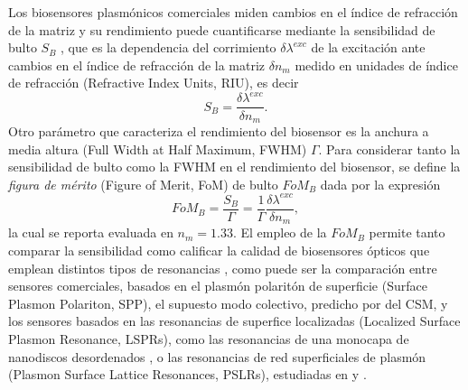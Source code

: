 Los biosensores plasmónicos comerciales miden cambios en el índice de refracción de la matriz y su rendimiento puede cuantificarse mediante la sensibilidad de bulto $S_B$ \cite{estevez2014trends,svedendahl2009refractometric}, que es la dependencia del corrimiento $\delta \lambda^{exc}$ de la excitación ante cambios en el índice de refracción de la matriz $\delta n_m$ medido en unidades de índice de refracción (Refractive Index Units, RIU), es decir
%
	\begin{equation}
	S_B = \frac{\delta \lambda^{exc}}{\delta n_m}.
	\label{eq:SBulk}
	\end{equation}
%
Otro parámetro que caracteriza el rendimiento del biosensor es la anchura a media altura (Full Width at Half Maximum, FWHM) $\Gamma$. Para considerar tanto la sensibilidad de bulto como la FWHM en el rendimiento del biosensor, se define la \emph{figura de mérito} (Figure of Merit, FoM) de bulto  $\textit{FoM}_B$ dada por la expresión
%
	\begin{equation}
	\textit{FoM}_B = \frac{S_B}{\Gamma}
			=\frac{1}{\Gamma}\frac{\delta \lambda^{exc}}{\delta n_m},
	\label{eq:FoM}
	\end{equation}
%
la cual se reporta evaluada en $n_m=1.33$. El empleo de la $\textit{FoM}_B$ permite tanto comparar la sensibilidad como calificar la calidad de biosensores ópticos que emplean distintos tipos de resonancias \cite{danilov2018ultra,svedendahl2009refractometric}, como puede ser la comparación entre sensores comerciales, basados en el plasmón polaritón de superficie (Surface Plasmon Polariton, SPP), el supuesto modo colectivo, predicho por del CSM, y los sensores basados en las resonancias de superfice localizadas (Localized Surface Plasmon Resonance, LSPRs), como las resonancias de una monocapa de nanodiscos desordenados \cite{svedendahl2009refractometric}, o las resonancias de red superficiales de plasmón (Plasmon Surface Lattice Resonances, PSLRs), estudiadas en \cite{kabashin2009plasmonic} y \cite{danilov2018ultra}.


